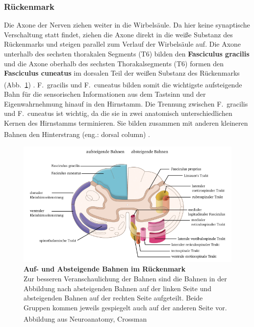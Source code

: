 \documentclass[12pt,a4paper,pdftex]{article}
\begin{document}
\subsubsection*{Rückenmark}
Die Axone der Nerven ziehen weiter in die Wirbelsäule. Da hier keine synaptische Verschaltung statt findet, ziehen die Axone direkt in die weiße Substanz des Rückenmarks und steigen parallel zum Verlauf der Wirbelsäule auf. Die Axone unterhalb des sechsten thorakalen Segments (T6) bilden den \textbf{Fasciculus gracilis}  und die Axone oberhalb des sechsten Thorakalsegments (T6) formen den \textbf{Fasciculus cuneatus}  im dorsalen Teil der weißen Substanz des Rückenmarks (Abb.~\ref{fig:bahnen_rueckenmark}) \textsuperscript{\cite[8]{paxinos2014rat}}. F.~gracilis und F.~cuneatus bilden somit die wichtigste aufsteigende Bahn für die sensorischen Informationen aus dem Tastsinn und der Eigenwahrnehmung hinauf in den Hirnstamm. 
Die Trennung zwischen F.~gracilis und F.~cuneatus ist wichtig, da die sie in zwei anatomisch unterschiedlichen Kernen des Hirnstamms terminieren. Sie bilden zusammen mit anderen kleineren Bahnen den Hinterstrang (eng.: dorsal column) \textsuperscript{\cite[22]{kandel2013principles}}. 

\begin{figure}[H]
    \centering
    \includegraphics [width = \textwidth]
    {pictures/somatosensory/aufabsteigendeBahnen_Rueckenmark.png}
    \caption[Auf- und Absteigende Bahnen im Rückenmark]{\textbf{Auf- und Absteigende Bahnen im Rückenmark}\\ Zur besseren Veranschaulichung der Bahnen sind die Bahnen in der Abbildung nach absteigenden Bahnen auf der linken Seite und absteigenden Bahnen auf der rechten Seite aufgeteilt. Beide Gruppen kommen jeweils gespiegelt auch auf der anderen Seite vor. Abbildung aus Neuroanatomy, Crossman
    \textsuperscript{\cite[8]{crossman2014neuroanatomy}}}
    \label{fig:bahnen_rueckenmark}
\end{figure}
\end{document}
